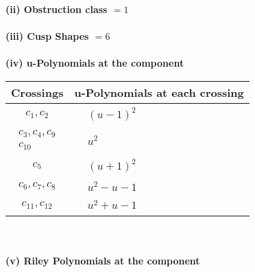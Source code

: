 \documentclass[1p]{elsarticle_modified}
\theoremstyle{definition}
\begin{document}
\flushleft \textbf{(ii) Obstruction class $= 1$}\\~\\
\flushleft \textbf{(iii) Cusp Shapes $= 6$}\\~\\
\newpage\renewcommand{\arraystretch}{1}
\flushleft \textbf{(iv) u-Polynomials at the component}\newline \\
\begin{tabular}{m{50pt}|m{274pt}}
Crossings & \hspace{64pt}u-Polynomials at each crossing \\
\hline $$\begin{aligned}c_{1},c_{2}\end{aligned}$$&$\begin{aligned}
&(u-1)^2
\end{aligned}$\\
\hline $$\begin{aligned}c_{3},c_{4},c_{9}\\c_{10}\end{aligned}$$&$\begin{aligned}
&u^2
\end{aligned}$\\
\hline $$\begin{aligned}c_{5}\end{aligned}$$&$\begin{aligned}
&(u+1)^2
\end{aligned}$\\
\hline $$\begin{aligned}c_{6},c_{7},c_{8}\end{aligned}$$&$\begin{aligned}
&u^2- u-1
\end{aligned}$\\
\hline $$\begin{aligned}c_{11},c_{12}\end{aligned}$$&$\begin{aligned}
&u^2+u-1
\end{aligned}$\\
\hline
\end{tabular}\\~\\
\newpage\renewcommand{\arraystretch}{1}
\flushleft \textbf{(v) Riley Polynomials at the component}\newline \\
\end{document}
